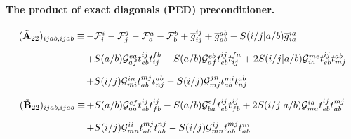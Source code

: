 \paragraph{The product of exact diagonals (PED) preconditioner.}

\begin{equation}
    \begin{array}{r@{\,}l}
        (\tilde{\mathbf{A}}_{22})_{ijab,ijab}
        \equiv
        &
        -
        \mathcal{F}_i^i
        -
        \mathcal{F}_j^j
        -
        \mathcal{F}_a^a
        -
        \mathcal{F}_b^b
        +
        \overline{g}_{ij}^{ij}
        +
        \overline{g}_{ab}^{ab}
        -
        S(i/j|a/b)
        \overline{g}_{ia}^{ia}
        \\[10pt]
        &
        +
        S(a/b)
        \mathcal{G}_{af}^{ea}
        t_{eb}^{ij}
        t_{ij}^{fb}
        -
        S(a/b)
        \mathcal{G}_{af}^{eb}
        t_{eb}^{ij}
        t_{ij}^{fa}
        +
        2
        S(i/j|a/b)
        \mathcal{G}_{ia}^{me}
        t_{eb}^{ij}
        t_{mj}^{ab}
        \\[10pt]
        &
        +
        S(i/j)
        \mathcal{G}_{mi}^{in}
        t_{ab}^{mj}
        t_{nj}^{ab}
        -
        S(i/j)
        \mathcal{G}_{mj}^{jn}
        t_{ab}^{mi}
        t_{nj}^{ab}
    \end{array}
\end{equation}

\begin{equation}
    \begin{array}{r@{\,}l}
        (\tilde{\mathbf{B}}_{22})_{ijab,ijab}
        \equiv
        &
        +
        S(a/b)
        \mathcal{G}_{aa}^{ef}
        t_{eb}^{ij}
        t_{fb}^{ij}
        -
        S(a/b)
        \mathcal{G}_{ba}^{ef}
        t_{eb}^{ij}
        t_{fb}^{ij}
        +
        2
        S(i/j|a/b)
        \mathcal{G}_{ma}^{ia}
        t_{eb}^{ij}
        t_{ab}^{mj}
        \\[10pt]
        &
        +
        S(i/j)
        \mathcal{G}_{mn}^{ii}
        t_{ab}^{mj}
        t_{ab}^{nj}
        -
        S(i/j)
        \mathcal{G}_{mn}^{ij}
        t_{ab}^{mj}
        t_{ab}^{ni}
    \end{array}
\end{equation}


